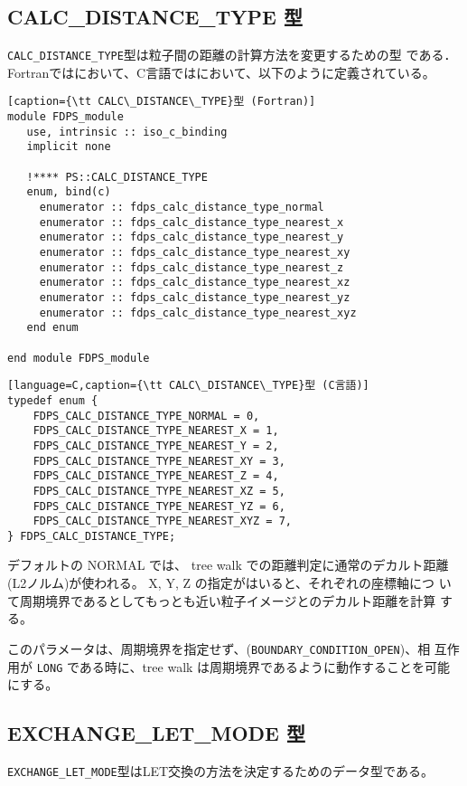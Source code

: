 \subsection{CALC\_DISTANCE\_TYPE 型}
\label{subsec:enum_calc_distance_typr}
{\tt CALC\_DISTANCE\_TYPE}型は粒子間の距離の計算方法を変更するための型
である．
Fortranではにおいて、C言語ではにおいて、以下のように定義されている。

\begin{lstlisting}[caption={\tt CALC\_DISTANCE\_TYPE}型 (Fortran)]
module FDPS_module
   use, intrinsic :: iso_c_binding
   implicit none
   
   !**** PS::CALC_DISTANCE_TYPE
   enum, bind(c)
     enumerator :: fdps_calc_distance_type_normal
     enumerator :: fdps_calc_distance_type_nearest_x
     enumerator :: fdps_calc_distance_type_nearest_y
     enumerator :: fdps_calc_distance_type_nearest_xy
     enumerator :: fdps_calc_distance_type_nearest_z
     enumerator :: fdps_calc_distance_type_nearest_xz
     enumerator :: fdps_calc_distance_type_nearest_yz
     enumerator :: fdps_calc_distance_type_nearest_xyz
   end enum
   
end module FDPS_module
\end{lstlisting}

\begin{lstlisting}[language=C,caption={\tt CALC\_DISTANCE\_TYPE}型 (C言語)]
typedef enum {
    FDPS_CALC_DISTANCE_TYPE_NORMAL = 0,
    FDPS_CALC_DISTANCE_TYPE_NEAREST_X = 1,
    FDPS_CALC_DISTANCE_TYPE_NEAREST_Y = 2,
    FDPS_CALC_DISTANCE_TYPE_NEAREST_XY = 3,
    FDPS_CALC_DISTANCE_TYPE_NEAREST_Z = 4,
    FDPS_CALC_DISTANCE_TYPE_NEAREST_XZ = 5,
    FDPS_CALC_DISTANCE_TYPE_NEAREST_YZ = 6,
    FDPS_CALC_DISTANCE_TYPE_NEAREST_XYZ = 7,
} FDPS_CALC_DISTANCE_TYPE;
\end{lstlisting}

デフォルトの NORMAL では、 tree walk での距離判定に通常のデカルト距離
(L2ノルム)が使われる。 X, Y, Z の指定がはいると、それぞれの座標軸につ
いて周期境界であるとしてもっとも近い粒子イメージとのデカルト距離を計算
する。

このパラメータは、周期境界を指定せず、({\tt BOUNDARY\_CONDITION\_OPEN})、相
互作用が {\tt LONG} である時に、tree walk は周期境界であるように動作することを可能にする。


\subsection{EXCHANGE\_LET\_MODE 型}
\label{subsec:enum_exchange_let_mode}
{\tt EXCHANGE\_LET\_MODE}型はLET交換の方法を決定するためのデータ型である。

